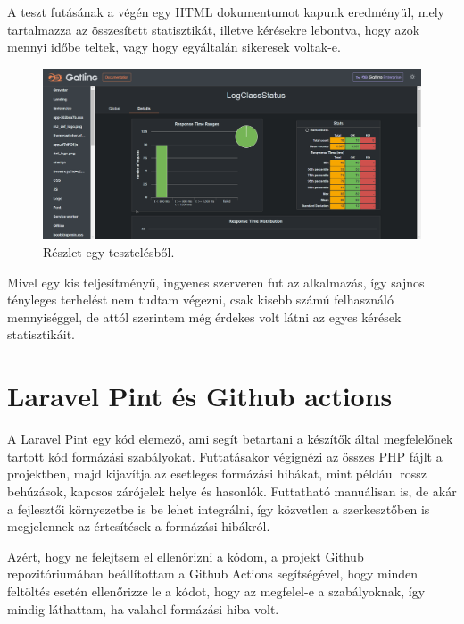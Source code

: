 \documentclass[
]{thesis-ekf}
\theoremstyle{definition}
\theoremstyle{remark}
\begin{document}


A teszt futásának a végén egy HTML dokumentumot kapunk eredményül, mely tartalmazza az összesített statisztikát, illetve kérésekre lebontva, hogy azok mennyi időbe teltek, vagy hogy egyáltalán sikeresek voltak-e.

\begin{figure}[ht!]
	\centering
	\includegraphics[width=15cm]{../pictures/screenshots/gatling.png}
	\caption{Részlet egy tesztelésből.}
	\label{gatlingResult}
\end{figure}

Mivel egy kis teljesítményű, ingyenes szerveren fut az alkalmazás, így sajnos tényleges terhelést nem tudtam végezni, csak kisebb számú felhasználó mennyiséggel, de attól szerintem még érdekes volt látni az egyes kérések statisztikáit.

\section{Laravel Pint és Github actions}

A Laravel Pint egy kód elemező, ami segít betartani a készítők által megfelelőnek tartott kód formázási szabályokat. Futtatásakor végignézi az összes PHP fájlt a projektben, majd kijavítja az esetleges formázási hibákat, mint például rossz behúzások, kapcsos zárójelek helye és hasonlók.\cite{pint} Futtatható manuálisan is, de akár a fejlesztői környezetbe is be lehet integrálni, így közvetlen a szerkesztőben is megjelennek az értesítések a formázási hibákról. 

Azért, hogy ne felejtsem el ellenőrizni a kódom, a projekt Github repozitóriumában beállítottam a Github Actions\cite{actions} segítségével, hogy minden feltöltés esetén ellenőrizze le a kódot, hogy az megfelel-e a szabályoknak, így mindig láthattam, ha valahol formázási hiba volt.
\end{document}
